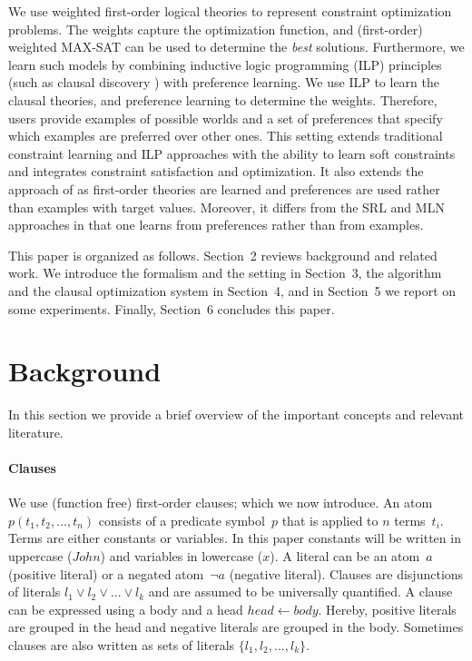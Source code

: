 \documentclass[letterpaper]{article}
\theoremstyle{definition}
\begin{document}
We use weighted first-order logical theories to represent constraint optimization problems.
The weights capture the optimization function, and (first-order) weighted MAX-SAT can be used to determine the \emph{best} solutions.
Furthermore, we learn such models by combining inductive logic programming (ILP) principles (such as clausal discovery \cite{DeRaedt:ClausalDiscovery}) with preference learning.
We use ILP to learn the clausal theories, and preference learning to determine the weights.
Therefore, users provide examples of possible worlds and a set of preferences that specify which examples are preferred over other ones.
This setting extends traditional constraint learning and ILP approaches with the ability to learn soft constraints and integrates constraint satisfaction and optimization.
It also extends the approach of \cite{campigotto2011active} as first-order theories are learned and preferences are used rather than examples with target values.
Moreover, it differs from the SRL and MLN approaches in that one learns from preferences rather than from examples.

This paper is organized as follows.
Section~2 reviews background and related work.
We introduce the formalism and the setting in Section~3, the algorithm and the clausal optimization system in Section~4, and in Section~5 we report on some experiments.
Finally, Section~6 concludes this paper.


\section{Background}
In this section we provide a brief overview of the important concepts and relevant literature.

\paragraph{Clauses}
We use (function free) first-order clauses; which we now introduce.
An atom $p(t_1, t_2, ..., t_n)$ consists of a predicate symbol~$p$ that is applied to $n$ terms~$t_i$.
Terms are either constants or variables.
In this paper constants will be written in uppercase ($\mathit{John}$) and variables in lowercase ($\mathit{x}$).
A literal can be an atom~$a$ (positive literal) or a negated atom~$\lnot a$ (negative literal).
Clauses are disjunctions of literals $l_1 \lor l_2 \lor ... \lor l_k$ and are assumed to be universally quantified.
A clause can be expressed using a body and a head $\mathit{head} \leftarrow \mathit{body}$.
Hereby, positive literals are grouped in the head and negative literals are grouped in the body.
Sometimes clauses are also written as sets of literals $\{l_1, l_2, ..., l_k\}$.
\end{document}
